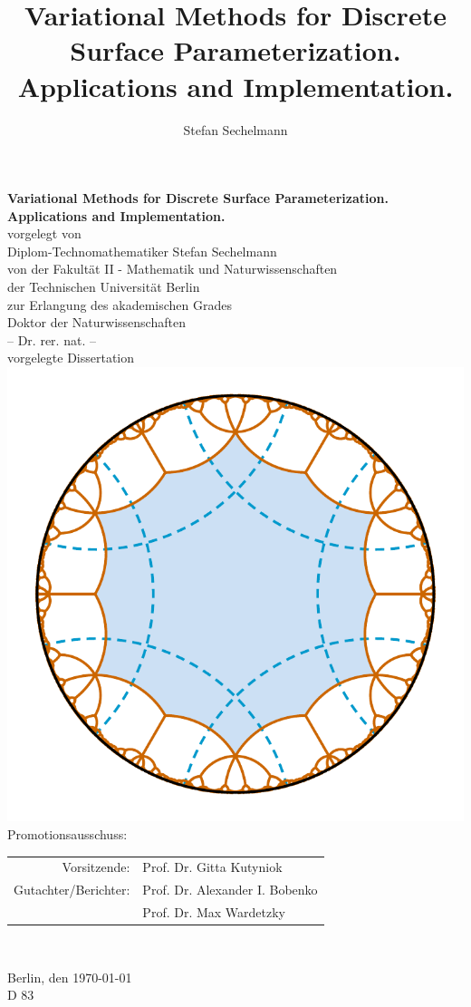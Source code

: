 \documentclass[a4paper]{book}
\title{Variational Methods for Discrete Surface Parameterization. Applications and Implementation.}
\author{Stefan Sechelmann}
\def\subfilebibliography {
	\backmatter
	\setcounter{secnumdepth}{-1}
	
	
}
\def\subfilebibliographytwo {
	\backmatter
	\setcounter{secnumdepth}{-1}
	
	
}
\begin{document}
\def\subfilebibliography{}
\def\subfilebibliographytwo{}

\frontmatter

\begin{titlepage}
\begin{center}
\large
{\Large\bf Variational Methods for Discrete Surface Parameterization. Applications and Implementation.}\\
\vspace{0.8cm}
vorgelegt von\\
Diplom-Technomathematiker Stefan Sechelmann\\
\vspace{0.8cm}
von der Fakult{\"a}t II - Mathematik und Naturwissenschaften\\
der Technischen Universit{\"a}t Berlin\\
zur Erlangung des akademischen Grades\\
\vspace{0.8cm}
Doktor der Naturwissenschaften\\
-- Dr. rer. nat. --\\
\vspace{0.8cm}
vorgelegte Dissertation\\
\vspace{0.8cm}
\includegraphics[width=0.4\linewidth]{introduction/title_lawson_cyclic.pdf}\\
\vspace{0.8cm}
Promotionsausschuss:\\
\vspace{0.3cm}
\begin{tabular}{rl}
Vorsitzende: & Prof. Dr. Gitta Kutyniok \\
Gutachter/Berichter: & Prof. Dr. Alexander I. Bobenko \\
& Prof. Dr. Max Wardetzky
\end{tabular}\\
\vspace{0.3cm}
\vspace{0.8cm}

Berlin, den {\today}\\
\vspace{0.3cm}
D 83
\end{center}
\end{titlepage}
\end{document}
